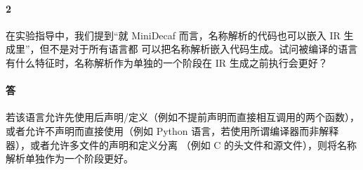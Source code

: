 \documentclass[UTF8]{ctexart}
\begin{document}
        \paragraph{2} 在实验指导中，我们提到“就 MiniDecaf 而言，名称解析的代码也可以嵌入 IR 生成里”，但不是对于所有语言都
        可以把名称解析嵌入代码生成。试问被编译的语言有什么特征时，名称解析作为单独的一个阶段在 IR 生成之前执行会更好？

        \paragraph{答} 若该语言允许先使用后声明/定义（例如不提前声明而直接相互调用的两个函数），
        或者允许不声明而直接使用（例如 Python 语言，若使用所谓编译器而非解释器），或者允许多文件的声明和定义分离
        （例如 C 的头文件和源文件），则将名称解析单独作为一个阶段更好。
\end{document}
